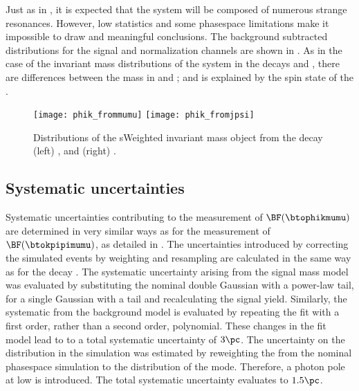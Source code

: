 Just as in \kpipi, it is expected that the \phik system will be composed of numerous strange
resonances.
However, low statistics and some phasespace limitations make it impossible to draw and meaningful
conclusions.
The background subtracted \phik distributions for the signal and normalization channels are shown
in .
As in the case of the invariant mass distributions of the \kpipi system in the decays \btokpipimumu
and \btojpsikpipi, there are differences between the \phik mass in \btophikmumu and \btojpsiphik;
and is explained by the spin state of the \jpsi.

\begin{figure}
  \begin{center}
    \texttt{[image: phik\_frommumu]}
    \texttt{[image: phik\_fromjpsi]}
    \caption[Invariant mass distributions of \phik in data]
    {
      Distributions of the sWeighted invariant mass \phik object from the decay
      (left) \btophikmumu, and
      (right) \btojpsiphik.
    }
    \label{fig:phik:phik}
  \end{center}
\end{figure}






\subsection{Systematic uncertainties}
\label{ssec:phik:syst}

Systematic uncertainties contributing to the measurement of $\BF(\btophikmumu)$ are determined in
very similar ways as for the measurement of $\BF(\btokpipimumu)$, as detailed in
.
The uncertainties introduced by correcting the simulated events by weighting and resampling are
calculated in the same way as for the decay \btokpipimumu.
The systematic uncertainty arising from the signal mass model was evaluated by
substituting the nominal double Gaussian with a power-law tail, for a single Gaussian with a tail
and recalculating the signal yield.
Similarly, the systematic from the background model is evaluated by repeating the fit with a first
order, rather than a second order, polynomial.
These changes in the fit model lead to to a total systematic uncertainty of \approx$3\pc$.
The uncertainty on the \qsq distribution in the simulation was estimated by reweighting the from
the nominal phasespace simulation to the distribution of the  mode.
Therefore, a photon pole at low \qsq is introduced.
The total systematic uncertainty evaluates to \approx$1.5\pc$.


